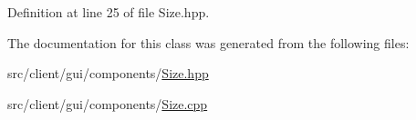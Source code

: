 Definition at line 25 of file Size.\+hpp.



The documentation for this class was generated from the following files\+:\begin{DoxyCompactItemize}
\item 
src/client/gui/components/\mbox{\hyperlink{_size_8hpp}{Size.\+hpp}}\item 
src/client/gui/components/\mbox{\hyperlink{_size_8cpp}{Size.\+cpp}}\end{DoxyCompactItemize}
